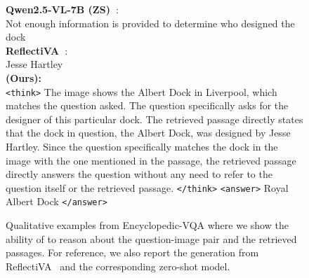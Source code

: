 \begin{figure}[t]
\begin{minipage}{\linewidth}
\begin{minipage}{0.7\linewidth}
{        \textbf{Qwen2.5-VL-7B (ZS)~\cite{bai2025qwen2}}:\\
        Not enough information is provided to determine who designed the dock \textcolor{red}{\xmark} \\
        \textbf{ReflectiVA~\cite{cocchi2025augmenting}}:\\
        Jesse Hartley \textcolor{red}{\xmark} \\
        \textbf{\ours (Ours):}\\
       \texttt{<think>} The image shows the Albert Dock in Liverpool, which matches the question asked. The question specifically asks for the designer of this particular dock. The retrieved passage directly states that the dock in question, the Albert Dock, was designed by Jesse Hartley. Since the question specifically matches the dock in the image with the one mentioned in the passage, the retrieved passage directly answers the question without any need to refer to the question itself or the retrieved passage. \texttt{</think>} \texttt{<answer>} Royal Albert Dock \textcolor[HTML]{00b050}{\cmark} \texttt{</answer>} 
        }
    \end{minipage}
\end{minipage}
\vspace{-0.1cm}
\caption{Qualitative examples from Encyclopedic-VQA where we show the ability of \ours to reason about the question-image pair and the retrieved passages. For reference, we also report the generation from ReflectiVA~\cite{cocchi2025augmenting} and the corresponding zero-shot model.}
\label{fig:qualitatives_suppl_reasoning}
\end{figure}


